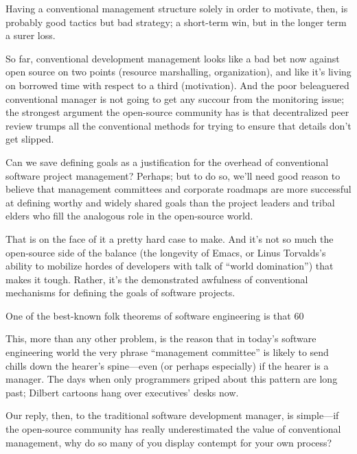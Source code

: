 \documentclass[a4paper,12pt,UTF8,twoside]{ctexbook}
\begin{document}
Having a conventional management structure solely in order to motivate, then, is probably good tactics but bad strategy; a short-term win, but in the longer term a surer loss.

So far, conventional development management looks like a bad bet now against open source on two points (resource marshalling, organization), and like it's living on borrowed time with respect to a third (motivation). And the poor beleaguered conventional manager is not going to get any succour from the monitoring issue; the strongest argument the open-source community has is that decentralized peer review trumps all the conventional methods for trying to ensure that details don't get slipped.

Can we save defining goals as a justification for the overhead of conventional software project management? Perhaps; but to do so, we'll need good reason to believe that management committees and corporate roadmaps are more successful at defining worthy and widely shared goals than the project leaders and tribal elders who fill the analogous role in the open-source world.

That is on the face of it a pretty hard case to make. And it's not so much the open-source side of the balance (the longevity of Emacs, or Linus Torvalds's ability to mobilize hordes of developers with talk of ``world domination'') that makes it tough. Rather, it's the demonstrated awfulness of conventional mechanisms for defining the goals of software projects.

One of the best-known folk theorems of software engineering is that 60%

This, more than any other problem, is the reason that in today's software engineering world the very phrase ``management committee'' is likely to send chills down the hearer's spine—even (or perhaps especially) if the hearer is a manager. The days when only programmers griped about this pattern are long past; Dilbert cartoons hang over executives' desks now.

Our reply, then, to the traditional software development manager, is simple—if the open-source community has really underestimated the value of conventional management, why do so many of you display contempt for your own process?
\end{document}
